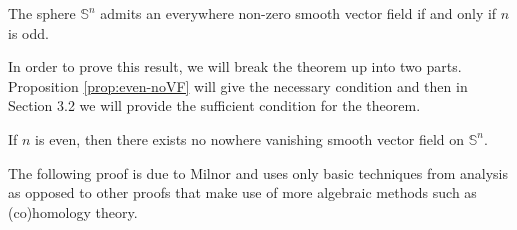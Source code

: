 \begin{theorem}
\label{thm:novan-iff-odd}
The sphere $\mathbb{S}^n$ admits an everywhere non-zero smooth vector field if and only if $n$ is odd.
\end{theorem}
In order to prove this result, we will break the theorem up into two parts. Proposition \ref{prop:even-noVF} will give the necessary condition and then in Section 3.2 we will provide the sufficient condition for the theorem.
\begin{proposition}
\label{prop:even-noVF}
If $n$ is even, then there exists no nowhere vanishing smooth vector field on $\mathbb{S}^n$.
\end{proposition}
The following proof is due to Milnor \cite{MR505523} and uses only basic techniques from analysis as opposed to other proofs that make use of more algebraic methods such as (co)homology theory.
